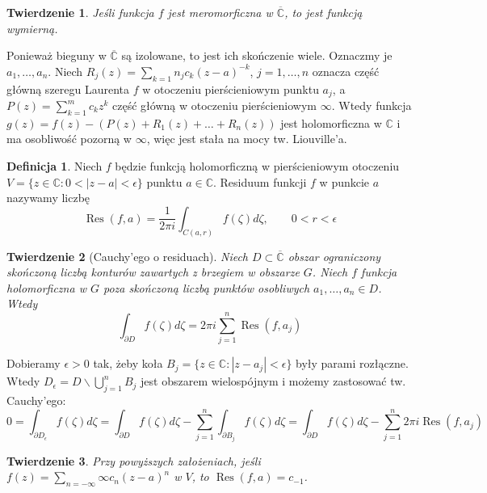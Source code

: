 \documentclass[11pt]{article}
\newcommand{\abs}[1]{\left|#1\right|} %
\newcommand{\extcomplex}{\overline{\mathbb{C}}} %
\newcommand{\res}{\mathop{\text{Res}}\limits} %
\theoremstyle{plain}
\newtheorem*{theorem}{Twierdzenie}
\theoremstyle{definition}
\newtheorem*{definition}{Definicja}
\theoremstyle{remark}
\let\oldendproof\endproof
\renewenvironment{proof}[1][\proofname]{
  \oldproof[\textsc{\small #1}]
}{\oldendproof}
\begin{document}
\begin{theorem}
  Jeśli funkcja $f$ jest meromorficzna w $ \extcomplex $, to jest funkcją wymierną.
\end{theorem}

\begin{proof}
  Ponieważ bieguny w $ \extcomplex $ są izolowane, to jest ich skończenie wiele.
  Oznaczmy je $ a_1, \dots, a_n $.
  Niech $ R_j(z) = \sum_{k=1}{n_j} c_{k} (z-a)^{-k} $, $ j = 1, \dots, n $ oznacza część główną szeregu Laurenta $ f $ w otoczeniu pierścieniowym punktu $ a_j $,
  a $ P(z) = \sum_{k=1}^{m} c_k z^k $ część główną w otoczeniu pierścieniowym $ \infty $.
  Wtedy funkcja $ g(z) = f(z) - (P(z) + R_1(z) + \dots + R_n(z)) $ jest holomorficzna w $ \mathbb{C} $ i ma osobliwość pozorną w $ \infty $,
  więc jest stała na mocy tw. Liouville'a.
\end{proof}

\begin{definition}
  Niech $ f $ będzie funkcją holomorficzną w pierścieniowym otoczeniu $ V = \{z \in \mathbb{C}\colon 0 < \abs{z-a} < \epsilon \} $ punktu $ a \in \mathbb{C} $.
  Residuum funkcji $ f $ w punkcie $ a $ nazywamy liczbę
  $$
    \res(f, a) = \frac{1}{2 \pi i} \int_{C(a, r)} f(\zeta) d\zeta,
    \qquad
    0 < r < \epsilon
  $$
\end{definition}

\begin{theorem}[Cauchy’ego o residuach]
  Niech $ D \subset \extcomplex $ obszar ograniczony skończoną liczbą konturów zawartych z brzegiem w obszarze $ G $.
  Niech $ f $ funkcja holomorficzna w $ G $ poza skończoną liczbą punktów osobliwych $ a_1, \dots, a_n \in D $.
  Wtedy
  $$
    \int_{\partial D} f(\zeta) d\zeta = 2 \pi i \sum_{j=1}^n \res(f, a_j)
  $$ 
\end{theorem}

\begin{proof}
  Dobieramy $ \epsilon > 0 $ tak, żeby koła $ B_j = \{ z \in \mathbb{C}: \abs{z - a_j} < \epsilon \} $ były parami rozłączne.
  Wtedy $ D_{\epsilon} = D\backslash\bigcup\limits_{j=1}^{n} B_j $ jest obszarem wielospójnym i możemy zastosować tw. Cauchy'ego:
  $$
    0
    = \int_{\partial D_{\epsilon}} f(\zeta) d\zeta
    = \int_{\partial D} f(\zeta) d\zeta - \sum_{j=1}^{n} \int_{\partial B_j} f(\zeta) d\zeta
    = \int_{\partial D} f(\zeta) d\zeta - \sum_{j=1}^{n} 2 \pi i \res(f, a_j)
  $$
\end{proof}

\begin{theorem}
  Przy powyższych założeniach, jeśli $ f(z) = \sum_{n=-\infty}{\infty} c_n (z-a)^n $ w $ V $, to $ \res(f, a) = c_{-1} $.
\end{theorem}
\end{document}
